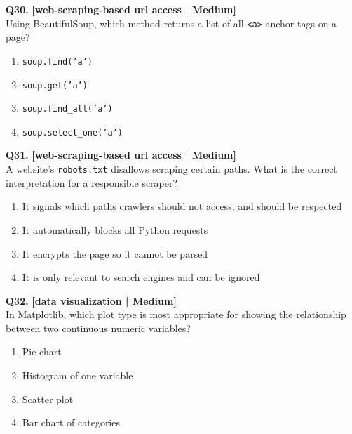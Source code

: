 \noindent\textbf{Q30.} \hfill {\small\color{LPUOrange}\textbf{[web-scraping-based url access | Medium]}}\\[2pt]
Using BeautifulSoup, which method returns a list of all \texttt{<a>} anchor tags on a page?

\begin{enumerate}[label=(\alph*),topsep=2pt,itemsep=1pt,partopsep=0pt,parsep=0pt]
    \item \relax \texttt{soup.find('a')}
    \item \relax \texttt{soup.get('a')}
    \item \relax \texttt{soup.find\_all('a')}
    \item \relax \texttt{soup.select\_one('a')}
\end{enumerate}
\vspace{2mm}

\noindent\textbf{Q31.} \hfill {\small\color{LPUOrange}\textbf{[web-scraping-based url access | Medium]}}\\[2pt]
A website's \texttt{robots.txt} disallows scraping certain paths. What is the correct interpretation for a responsible scraper?

\begin{enumerate}[label=(\alph*),topsep=2pt,itemsep=1pt,partopsep=0pt,parsep=0pt]
    \item \relax It signals which paths crawlers should not access, and should be respected
    \item \relax It automatically blocks all Python requests
    \item \relax It encrypts the page so it cannot be parsed
    \item \relax It is only relevant to search engines and can be ignored
\end{enumerate}
\vspace{2mm}

\noindent\textbf{Q32.} \hfill {\small\color{LPUOrange}\textbf{[data visualization | Medium]}}\\[2pt]
In Matplotlib, which plot type is most appropriate for showing the relationship between two continuous numeric variables?

\begin{enumerate}[label=(\alph*),topsep=2pt,itemsep=1pt,partopsep=0pt,parsep=0pt]
    \item \relax Pie chart
    \item \relax Histogram of one variable
    \item \relax Scatter plot
    \item \relax Bar chart of categories
\end{enumerate}
\vspace{2mm}

